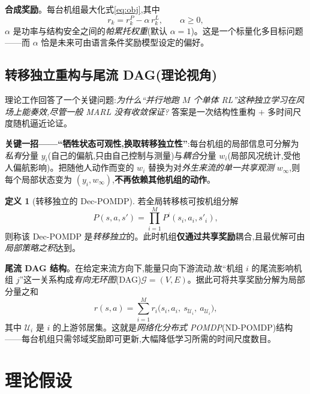 \documentclass[12pt,a4paper]{article}
\theoremstyle{definition}
\newtheorem{definition}{定义}
\theoremstyle{plain}
\newcommand{\calG}{\mathcal{G}}
\begin{document}
\textbf{合成奖励}。每台机组最大化式\eqref{eq:obj},其中
\begin{equation}
  r_k=r^{P}_k-\alpha\,r^{L}_k,\qquad \alpha\ge0,
  \label{eq:rcomb}
\end{equation}
$\alpha$ 是功率与结构安全之间的\emph{帕累托权重}(默认 $\alpha=1$)。这是一个标量化多目标问题——而 $\alpha$ 恰是未来可由语言条件奖励模型设定的偏好。

\subsection{转移独立重构与尾流 DAG(理论视角)}

理论工作\cite{theory}回答了一个关键问题:\emph{为什么“并行地跑 $M$ 个单体 RL”这种独立学习在风场上能奏效,尽管一般 MARL 没有收敛保证?} 答案是一次结构性重构 $+$ 多时间尺度随机逼近论证。

\textbf{关键一招——“牺牲状态可观性,换取转移独立性”}:每台机组的局部信息可分解为\emph{私有}分量 $y_i$(自己的偏航,只由自己控制与测量)与\emph{耦合}分量 $w_i$(局部风况统计,受他人偏航影响)。把随他人动作而变的 $w_i$ 替换为对\emph{外生来流的单一共享观测} $w_\infty$,则每个局部状态变为 $(y_i,w_\infty)$,\textbf{不再依赖其他机组的动作}。

\begin{definition}[转移独立的 Dec-POMDP]
若全局转移核可按机组分解
\begin{equation}
  P(s,a,s')=\prod_{i=1}^{M}P^i(s_i,a_i,s'_i),
\end{equation}
则称该 Dec-POMDP 是\emph{转移独立}的。此时机组\textbf{仅通过共享奖励}耦合,且最优解可由\emph{局部策略之积}达到。
\end{definition}

\textbf{尾流 DAG 结构}。在给定来流方向下,能量只向下游流动,故“机组 $i$ 的尾流影响机组 $j$”这一关系构成\emph{有向无环图}(DAG)$\calG=(V,E)$。据此可将共享奖励分解为局部分量之和
\begin{equation}
  r(s,a)=\sum_{i=1}^{M}r_i\big(s_i,a_i,\ s_{\mathcal U_i},\ a_{\mathcal U_i}\big),
\end{equation}
其中 $\mathcal U_i$ 是 $i$ 的上游邻居集。这就是\emph{网络化分布式 POMDP}(ND-POMDP)结构——每台机组只需邻域奖励即可更新,大幅降低学习所需的时间尺度数目。

\section{理论假设}
\end{document}
